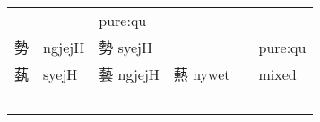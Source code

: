 \documentclass[14pt,a4paper]{scrartcl}
\begin{document}
\begin{longtable}[c]{@{}llllll@{}}
\begin{minipage}[t]{0.14\columnwidth}\raggedright\strut
\strut\end{minipage} &
\begin{minipage}[t]{0.14\columnwidth}\raggedright\strut
\strut\end{minipage} &
\begin{minipage}[t]{0.14\columnwidth}\raggedright\strut
pure:qu
\strut\end{minipage}\tabularnewline
\begin{minipage}[t]{0.14\columnwidth}\raggedright\strut
勢
\strut\end{minipage} &
\begin{minipage}[t]{0.14\columnwidth}\raggedright\strut
ngjejH
\strut\end{minipage} &
\begin{minipage}[t]{0.14\columnwidth}\raggedright\strut
勢 syejH
\strut\end{minipage} &
\begin{minipage}[t]{0.14\columnwidth}\raggedright\strut
\strut\end{minipage} &
\begin{minipage}[t]{0.14\columnwidth}\raggedright\strut
\strut\end{minipage} &
\begin{minipage}[t]{0.14\columnwidth}\raggedright\strut
pure:qu
\strut\end{minipage}\tabularnewline
\begin{minipage}[t]{0.14\columnwidth}\raggedright\strut
蓺
\strut\end{minipage} &
\begin{minipage}[t]{0.14\columnwidth}\raggedright\strut
syejH
\strut\end{minipage} &
\begin{minipage}[t]{0.14\columnwidth}\raggedright\strut
藝 ngjejH
\strut\end{minipage} &
\begin{minipage}[t]{0.14\columnwidth}\raggedright\strut
爇 nywet
\strut\end{minipage} &
\begin{minipage}[t]{0.14\columnwidth}\raggedright\strut
\strut\end{minipage} &
\begin{minipage}[t]{0.14\columnwidth}\raggedright\strut
mixed
\strut\end{minipage}\tabularnewline
\begin{minipage}[t]{0.14\columnwidth}\raggedright\strut
𡎐
\strut\end{minipage} &

\end{longtable}
\end{document}
